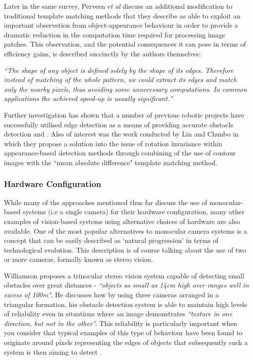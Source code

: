 Later in the same survey, Perveen \textit{et al} discuss an additional modification to traditional template matching methods that they describe as able to exploit an important observation from object-appearance behaviour in order to provide a dramatic reduction in the computation time required for processing image patches. This observation, and the potential consequences it can pose in terms of efficiency gains, is described succinctly by the authors themselves:

\indent \textit{``The shape of any object is defined solely by the shape of its edges. Therefore instead of matching of the whole pattern, we could extract its edges and match only the nearby pixels, thus avoiding some unnecessary computations. In common applications the achieved speed-up is usually significant."} \cite{perveen}

Further investigation has shown that a number of previous robotic projects have successfully utilised edge detection as a means of providing accurate obstacle detection \cite{hanumante} and \cite{borenstein}. Also of interest was the work conducted by Lin and Chunbo \cite{lin} in which they propose a solution into the issue of rotation invariance within appearance-based detection methods through combining of the use of contour images with the ``mean absolute difference" template matching method. 

\subsubsection{Hardware Configuration}
 
While many of the approaches mentioned thus far discuss the use of monocular-based systems (i.e a single camera) for their hardware configuration, many other examples of vision-based systems using alternative choices of hardware are also available. One of the most popular alternatives to monocular camera systems is a concept that can be easily described as `natural progression' in terms of technological evolution. This description is of course talking about the use of two or more cameras, formally known as stereo vision. 

Williamson \cite{williamson} proposes a trinocular stereo vision system capable of detecting small obstacles over great distances - \textit{``objects as small as 14cm high over ranges well in excess of 100m"}. He discusses how by using three cameras arranged in a triangular formation, his obstacle detection system is able to maintain high levels of reliability even in situations where an image demonstrates \textit{``texture in one direction, but not in the other"}. This reliability is particularly important when you consider that typical examples of this type of behaviour have been found to originate around pixels representing the edges of objects that subsequently such a system is then aiming to detect \cite{williamson}. 

